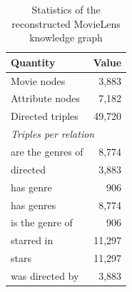 \begin{table}[H]
\centering
\small
\begin{tabular}{lr}
\toprule
Quantity & Value \\
\midrule
Movie nodes & 3,883 \\
Attribute nodes & 7,182 \\
Directed triples & 49,720 \\
\multicolumn{2}{l}{\textit{Triples per relation}} \\
\quad are the genres of & 8,774 \\
\quad directed & 3,883 \\
\quad has genre & 906 \\
\quad has genres & 8,774 \\
\quad is the genre of & 906 \\
\quad starred in & 11,297 \\
\quad stars & 11,297 \\
\quad was directed by & 3,883 \\
\bottomrule
\end{tabular}
\caption{Statistics of the reconstructed MovieLens knowledge graph}
\label{tab:kg_stats}
\end{table}
